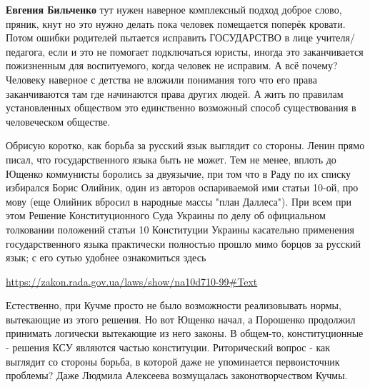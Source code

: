 \begin{itemize}
\begin{itemize}
\textbf{Евгения Бильченко} тут нужен наверное комплексный подход доброе слово,
пряник, кнут но это нужно делать пока человек помещается поперёк кровати. Потом
ошибки родителей пытается исправить ГОСУДАРСТВО в лице учителя/педагога, если и
это не помогает подключаться юристы, иногда это заканчивается пожизненным для
воспитуемого, когда человек не исправим. А всё почему? Человеку наверное с
детства не вложили понимания того что его права заканчиваются там где
начинаются права других людей. А жить по правилам установленных обществом это
единственно возможный способ существования в человеческом обществе.
\end{itemize}

 

Обрисую коротко, как борьба за русский язык выглядит со стороны. Ленин прямо
писал, что государственного языка быть не может. Тем не менее, вплоть до Ющенко
коммунисты боролись за двуязычие, при том что в Раду по их списку избирался
Борис Олийник, один из авторов оспариваемой ими статьи 10-ой, про мову (еще
Олийник вбросил в народные массы "план Даллеса"). При всем при этом Решение
Конституционного Суда Украины по делу об официальном толковании положений
статьи 10 Конституции Украины касательно применения государственного языка
практически полностью прошло мимо борцов за русский язык; с его сутью удобнее
ознакомиться здесь

\url{https://zakon.rada.gov.ua/laws/show/na10d710-99#Text}

 

Естественно, при Кучме просто не было возможности реализовывать нормы,
вытекающие из этого решения. Но вот Ющенко начал, а Порошенко продолжил
принимать логически вытекающие из него законы. В общем-то, конституционные -
решения КСУ являются частью конституции. Риторический вопрос - как выглядит со
стороны борьба, в которой даже не упоминается первоисточник проблемы? Даже
Людмила Алексеева возмущалась законотворчеством Кучмы.

 

\end{itemize}
